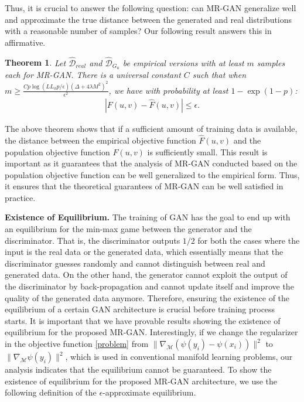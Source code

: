 \documentclass[10pt,twocolumn,letterpaper]{article}
\newcommand{\g}{{G_u}}
\newcommand{\D}{\mathcal{D}}
\newcommand{\M}{\mathcal{M}}
\newtheorem{thm}{Theorem}
\begin{document}
Thus, it is crucial to answer the following question: can MR-GAN generalize well and approximate the true distance between the generated and real distributions with a reasonable number of samples? Our following result answers this in affirmative. 
\begin{thm}\label{thm_realizability}
	Let $\hat{\D}_{real}$ and $\hat{\D}_\g$ be empirical versions with at least $m$ samples each for MR-GAN. There is a universal constant $C$ such that when $m \ge \frac{Cp\log(LL_\phi p/\epsilon)(\Delta+4\lambda M^2)^2}{\epsilon^2} $, we have with probability at least $1-\exp (1-p)$: 
	\begin{align}
	|F(u,v)-\hat F(u,v)|\le \epsilon.
	\end{align}
\end{thm}
{{The above theorem shows that if a sufficient amount of training data is available, the distance between the empirical objective function $\hat F(u,v)$ and the population objective function $F(u,v)$ is sufficiently small.} This result is important as it guarantees that the analysis of MR-GAN conducted based on the population objective function can be well generalized to the empirical form. Thus, it ensures that the theoretical guarantees of MR-GAN can be well satisfied in practice.}

\textbf{Existence of Equilibrium.} The training of GAN has the goal to end up with an equilibrium for the min-max game between the generator and the discriminator. That is, the discriminator outputs $1/2$ for both the cases where the input is the real data or the generated data, which essentially means that the discriminator guesses randomly and cannot distinguish between real and generated data. On the other hand, the generator cannot exploit the output of the discriminator by back-propagation and cannot update itself and improve the quality of the generated data anymore. Therefore, ensuring the existence of the equilibrium of a certain GAN architecture is crucial before training process starts. It is important that we have provable results showing the existence of equilibrium for the proposed MR-GAN. Interestingly, if we change the regularizer in the objective function \eqref{problem} from $\|\nabla_\M (\psi(y_i)-\psi(x_i))\|^2$ to $\|\nabla_\M \psi(y_i)\|^2$, which is used in conventional manifold learning problems, our analysis indicates that the equilibrium cannot be guaranteed. To show the existence of equilibrium for the proposed MR-GAN architecture, we use the following definition of the $\epsilon$-approximate equilibrium.
\end{document}

